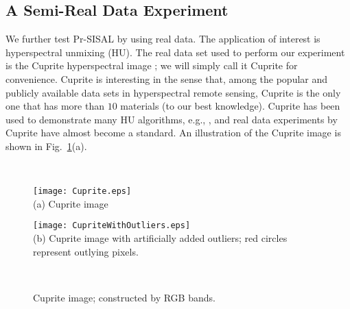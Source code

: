 \documentclass[10pt,twocolumn,twoside]{IEEEtran}
\makeatletter
\newcommand\figcaption{\def\@captype{figure}\caption}
\newcommand\tabcaption{\def\@captype{table}\caption}
\makeatother
\begin{document}
%
%



\subsection{A Semi-Real Data Experiment}

We further test Pr-SISAL by using real data.
The application of interest is hyperspectral unmixing (HU). The real data set used to perform our experiment is the Cuprite hyperspectral image \cite{vane1993airborne}; we will simply call it Cuprite for convenience.
Cuprite is interesting in the sense that, among the popular and publicly available data sets in hyperspectral remote sensing, Cuprite is the only one that has more than $10$ materials (to our best knowledge).
Cuprite has been used to demonstrate many HU algorithms, e.g., \cite{Nascimento2005,Chan2009,MVSA,PRISM2021},
and real data experiments by Cuprite have almost become a standard.
An illustration of the Cuprite image is shown in Fig.~\ref{fig:Cuprite_data}(a). 

\begin{figure}[htb!]
	\centering
	~ \hfil
	\begin{minipage}[t]{.4\textwidth}
		\centering
		\texttt{[image: Cuprite.eps]} \\
		(a)  Cuprite image
	\end{minipage}
	\hfil
	\begin{minipage}[t]{.4\textwidth}
		\centering
		\texttt{[image: CupriteWithOutliers.eps]} \\
		(b) Cuprite image with artificially added  outliers; red circles represent outlying pixels.
	\end{minipage}
	\hfil ~
	\caption{Cuprite image; constructed by RGB bands.}
	\label{fig:Cuprite_data}	
\end{figure}
\end{document}
